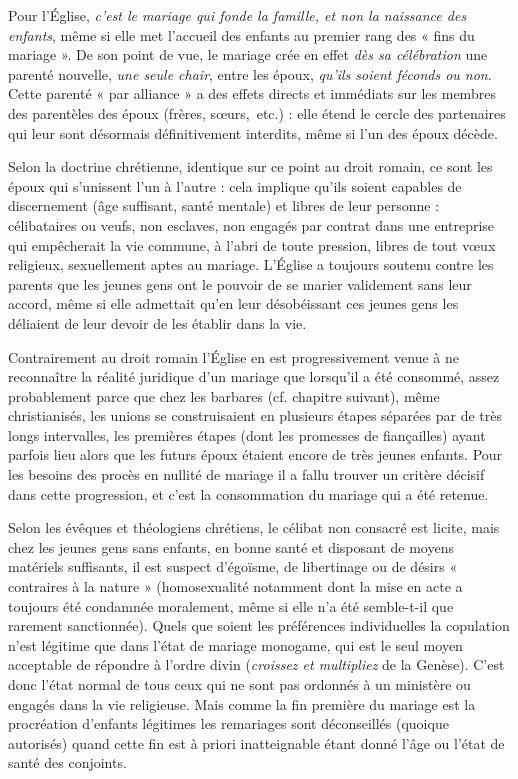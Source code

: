  Pour l'Église, \emph{c'est le mariage qui fonde la famille, et non la naissance des enfants}, même si elle met l'accueil des enfants au premier rang des « fins du mariage ». De son point de vue, le mariage crée en effet \emph{dès sa célébration} une parenté nouvelle, \emph{une seule chair}, entre les époux, \emph{qu'ils soient féconds ou non}. Cette parenté « par alliance » a des effets directs et immédiats sur les membres des parentèles des époux (frères, sœurs,~etc.) : elle étend le cercle des partenaires qui leur sont désormais définitivement interdits, même si l'un des époux décède.

 Selon la doctrine chrétienne, identique sur ce point au droit romain, ce sont les époux qui s'unissent l'un à l'autre : cela implique qu'ils soient capables de discernement (âge suffisant, santé mentale) et libres de leur personne : célibataires ou veufs, non esclaves, non engagés par contrat dans une entreprise qui empêcherait la vie commune, à l'abri de toute pression, libres de tout vœux religieux, sexuellement aptes au mariage. L'Église a toujours soutenu contre les parents que les jeunes gens ont le pouvoir de se marier validement sans leur accord, même si elle admettait qu'en leur désobéissant ces jeunes gens les déliaient de leur devoir de les établir dans la vie. 

 Contrairement au droit romain l'Église en est progressivement venue à ne reconnaître la réalité juridique d'un mariage que lorsqu'il a été consommé, assez probablement parce que chez les barbares (cf. chapitre suivant), même christianisés, les unions se construisaient en plusieurs étapes séparées par de très longs intervalles, les premières étapes (dont les promesses de fiançailles) ayant parfois lieu alors que les futurs époux étaient encore de très jeunes enfants. Pour les besoins des procès en nullité de mariage il a fallu trouver un critère décisif dans cette progression, et c'est la consommation du mariage qui a été retenue. 

 Selon les évêques et théologiens chrétiens, le célibat non consacré est licite, mais chez les jeunes gens sans enfants, en bonne santé et disposant de moyens matériels suffisants, il est suspect d'égoïsme, de libertinage ou de désirs « contraires à la nature » (homosexualité notamment dont la mise en acte a toujours été condamnée moralement, même si elle n'a été semble-t-il que rarement sanctionnée). Quels que soient les préférences individuelles la copulation n'est légitime que dans l'état de mariage monogame, qui est le seul moyen acceptable de répondre à l'ordre divin (\emph{croissez et multipliez} de la Genèse). C'est donc l'état normal de tous ceux qui ne sont pas ordonnés à un ministère ou engagés dans la vie religieuse. Mais comme la fin première du mariage est la procréation d'enfants légitimes les remariages sont déconseillés (quoique autorisés) quand cette fin est à priori inatteignable étant donné l'âge ou l'état de santé des conjoints. 

